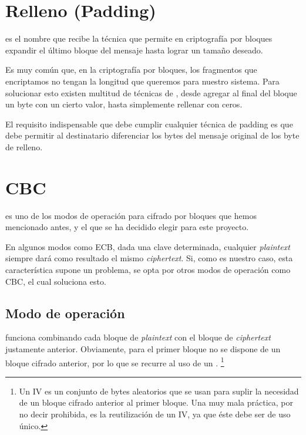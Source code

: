 
\section{Relleno (Padding)}

 es el nombre que recibe la técnica que permite en criptografía por bloques expandir el último bloque del mensaje hasta lograr un tamaño deseado.

Es muy común que, en la criptografía por bloques, los fragmentos que encriptamos no tengan la longitud que queremos para nuestro sistema.
Para solucionar esto existen multitud de técnicas de , desde agregar al final del bloque un byte con un cierto valor, hasta simplemente rellenar con ceros.

El requisito indispensable que debe cumplir cualquier técnica de padding es que debe permitir al destinatario diferenciar los bytes del mensaje original de los byte de relleno. \emph{\parencite{Reference8}}


\section{CBC}

 es uno de los modos de operación para cifrado por bloques que hemos mencionado antes,
y el que se ha decidido elegir para este proyecto.

En algunos modos como ECB, dada una clave determinada,
cualquier \emph{plaintext} siempre dará como resultado el mismo \emph{ciphertext}.
Si, como es nuestro caso, esta característica supone un problema,
se opta por otros modos de operación como CBC, el cual soluciona esto. \emph{\parencite{Reference23}}

\subsection{Modo de operación}

 funciona combinando cada bloque de \emph{plaintext} con el bloque de \emph{ciphertext} justamente anterior.
Obviamente, para el primer bloque no se dispone de un bloque cifrado anterior,
por lo que se recurre al uso de un .
\footnote{Un IV es un conjunto de bytes aleatorios que se usan para suplir la necesidad de un bloque cifrado anterior al primer bloque.
Una muy mala práctica, por no decir prohibida, es la reutilización de un IV, ya que éste debe ser de uso único.}

